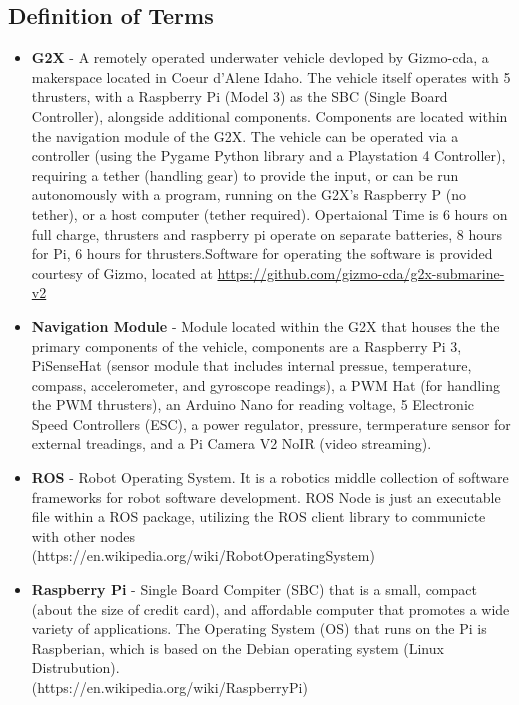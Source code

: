 \documentclass[12pt]{article}
\begin{document}
		\subsection{Definition of Terms}
			\begin{itemize}
				\item \textbf{G2X} - A remotely operated underwater vehicle devloped by Gizmo-cda, a makerspace located in Coeur d'Alene Idaho. The vehicle itself operates with 5 thrusters, with a Raspberry Pi (Model 3) as the SBC (Single Board Controller), alongside additional components. Components are located within the navigation module of the G2X. The vehicle can be operated via a controller (using the Pygame Python library and a Playstation 4 Controller), requiring a tether (handling gear) to provide the input, or can be run autonomously with a program, running on the G2X's Raspberry P (no tether), or a host computer (tether required). Opertaional Time is 6 hours on full charge, thrusters and raspberry pi operate on separate batteries, 8 hours for Pi, 6 hours for thrusters.Software for operating the software is provided courtesy of Gizmo, located at \url{https://github.com/gizmo-cda/g2x-submarine-v2}
				\item \textbf{Navigation Module} - Module located within the G2X that houses the the primary components of the vehicle, components are a Raspberry Pi 3, PiSenseHat (sensor module that includes internal pressue, temperature, compass, accelerometer, and gyroscope readings), a PWM Hat (for handling the PWM thrusters), an Arduino Nano for reading voltage, 5 Electronic Speed Controllers (ESC), a power regulator, pressure, termperature sensor for external treadings, and a Pi Camera V2 NoIR (video streaming).
				\item \textbf{ROS} - Robot Operating System. It is a robotics middle collection of software frameworks for robot software development. ROS Node is just an executable file within a ROS package, utilizing the ROS client library to communicte with other nodes\\ (https://en.wikipedia.org/wiki/Robot\textunderscore Operating\textunderscore System)
				\item \textbf{Raspberry Pi} - Single Board Compiter (SBC) that is a small, compact (about the size of credit card), and affordable computer that promotes a wide variety of applications. The Operating System (OS) that runs on the Pi is Raspberian, which is based on the Debian operating system (Linux Distrubution).\\ (https://en.wikipedia.org/wiki/Raspberry\textunderscore Pi)	

\end{itemize}
\end{document}
